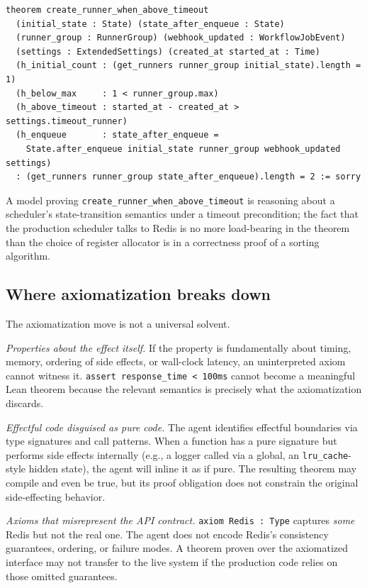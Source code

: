 \begin{lstlisting}[style=code, language=Lean, basicstyle=\ttfamily\scriptsize]
theorem create_runner_when_above_timeout
  (initial_state : State) (state_after_enqueue : State)
  (runner_group : RunnerGroup) (webhook_updated : WorkflowJobEvent)
  (settings : ExtendedSettings) (created_at started_at : Time)
  (h_initial_count : (get_runners runner_group initial_state).length = 1)
  (h_below_max     : 1 < runner_group.max)
  (h_above_timeout : started_at - created_at > settings.timeout_runner)
  (h_enqueue       : state_after_enqueue =
    State.after_enqueue initial_state runner_group webhook_updated settings)
  : (get_runners runner_group state_after_enqueue).length = 2 := sorry
\end{lstlisting}

A model proving \texttt{create\_runner\_when\_above\_timeout} is reasoning about a scheduler's state-transition semantics under a timeout precondition; the fact that the production scheduler talks to Redis is no more load-bearing in the theorem than the choice of register allocator is in a correctness proof of a sorting algorithm.

\subsection{Where axiomatization breaks down}
\label{sec:threats-axiom-limits}

The axiomatization move is not a universal solvent.

\emph{Properties about the effect itself.} If the property is fundamentally about timing, memory, ordering of side effects, or wall-clock latency, an uninterpreted axiom cannot witness it. \texttt{assert response\_time < 100ms} cannot become a meaningful Lean theorem because the relevant semantics is precisely what the axiomatization discards.

\emph{Effectful code disguised as pure code.} The agent identifies effectful boundaries via type signatures and call patterns. When a function has a pure signature but performs side effects internally (e.g., a logger called via a global, an \texttt{lru\_cache}-style hidden state), the agent will inline it as if pure. The resulting theorem may compile and even be true, but its proof obligation does not constrain the original side-effecting behavior.

\emph{Axioms that misrepresent the API contract.} \texttt{axiom Redis : Type} captures \emph{some} Redis but not the real one. The agent does not encode Redis's consistency guarantees, ordering, or failure modes. A theorem proven over the axiomatized interface may not transfer to the live system if the production code relies on those omitted guarantees.

